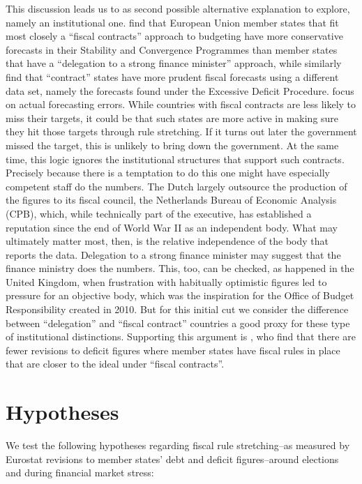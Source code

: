 \documentclass[]{article}
\begin{document}
This discussion leads us to as second possible alternative explanation to explore, namely an  institutional one.  \cite{hallerbergstrauch209} find that European Union member states that fit most closely a ``fiscal contracts'' approach to budgeting have more conservative forecasts in their Stability and Convergence Programmes than member states that have a ``delegation to a strong finance minister'' approach, while \cite{PinaVenes2011} similarly find that ``contract'' states have more prudent fiscal forecasts using a different data set, namely the forecasts found under the Excessive Deficit Procedure. \cite{hallerbergstrauch209} focus on actual forecasting errors. While countries with fiscal contracts are less likely to miss their targets, it could be that such states are more active in making sure they hit those targets through rule stretching.  If it turns out later the government missed the target, this is unlikely to bring down the government. At the same time, this logic ignores the institutional structures that support such contracts. Precisely because  there is a temptation to do this one might have especially competent staff do the numbers. The Dutch largely outsource the production of the figures to its fiscal council, the Netherlands Bureau of Economic Analysis (CPB), which, while technically part of the executive, has established a reputation since the end of World War II as an independent body. What may ultimately matter most, then, is the relative independence of the body that reports the data. Delegation to a strong finance minister may suggest that the finance ministry does the numbers. This, too, can be checked, as happened in the United Kingdom, when frustration with habitually optimistic figures led to pressure for an objective body, which was the inspiration for the Office of Budget Responsibility created in 2010. But for this initial cut we consider the difference between ``delegation'' and ``fiscal contract'' countries a good proxy for these type of institutional distinctions. Supporting this argument is \cite{DeCastro2013}, who find that there are fewer revisions to deficit figures where member states have fiscal rules in place that are closer to the ideal under ``fiscal contracts''.

\section{Hypotheses}

We test the following hypotheses regarding fiscal rule stretching--as measured by Eurostat revisions to member states' debt and deficit figures--around elections and during financial market stress:
\end{document}
